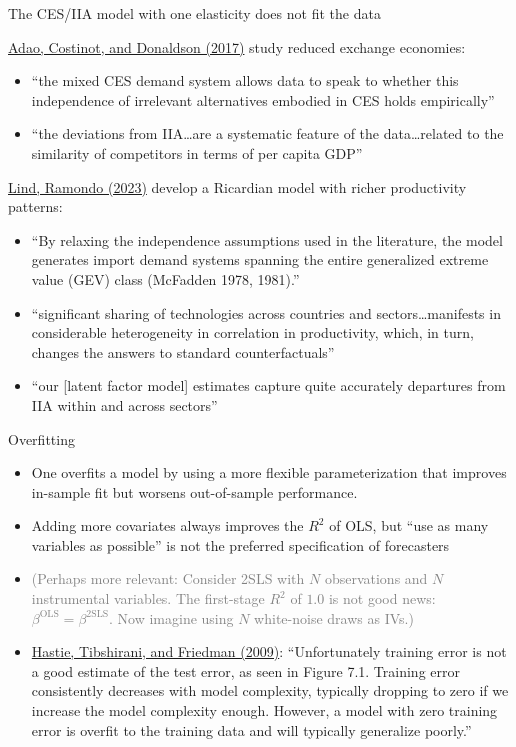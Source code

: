 \documentclass[11pt,notes=hide,aspectratio=169]{beamer}
\begin{document}
\begin{frame}{The CES/IIA model with one elasticity does not fit the data}
{\small
\href{https://www.aeaweb.org/articles?id=10.1257/aer.20150956}{Adao, Costinot, and Donaldson (2017)} study reduced exchange economies:
\begin{itemize}
\item ``the mixed CES demand system allows data to speak to whether this independence of irrelevant alternatives embodied in CES holds empirically''
\item ``the deviations from IIA\dots are a systematic feature of the data\dots related to the similarity of competitors in terms of per capita GDP''
\end{itemize}
\href{https://www.aeaweb.org/articles?id=10.1257/aer.20190781}{Lind, Ramondo (2023)} develop a Ricardian model with richer productivity patterns:
\begin{itemize}
\item ``By relaxing the independence assumptions used in the literature, the model generates import demand systems spanning the entire generalized extreme value (GEV) class (McFadden 1978, 1981).''
\item ``significant sharing of technologies across countries and sectors\dots manifests in considerable heterogeneity in correlation in productivity, which, in turn, changes the answers to standard counterfactuals''
\item ``our [latent factor model] estimates capture quite accurately departures from IIA within and across sectors''
\end{itemize}
}\end{frame}
\begin{frame}{Overfitting}
\begin{itemize}
\item
One overfits a model by using a more flexible parameterization that improves in-sample fit but worsens out-of-sample performance.
\item
Adding more covariates always improves the $R^2$ of OLS, but ``use as many variables as possible'' is not the preferred specification of forecasters 
\item[]
\textcolor{gray}{(Perhaps more relevant: Consider 2SLS with $N$ observations and $N$ instrumental variables. The first-stage $R^2$ of $1.0$ is not good news: $\beta^{\text{OLS}} = \beta^{\text{2SLS}}$. Now imagine using $N$ white-noise draws as IVs.)}
\item
\href{https://hastie.su.domains/ElemStatLearn/}{Hastie, Tibshirani, and Friedman (2009)}:
``Unfortunately training error is not a good estimate of the test error, as seen in Figure 7.1. Training error consistently decreases with model complexity, typically dropping to zero if we increase the model complexity enough. However, a model with zero training error is overfit to the training data and will typically generalize poorly.''
\end{itemize}
\end{frame}
\end{document}
